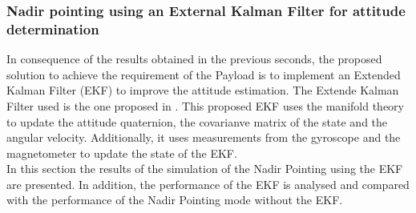 \subsubsection{Nadir pointing using an External Kalman Filter for attitude determination}
In consequence of the results obtained in the previous seconds, the proposed solution to achieve
the requirement of the Payload is to implement an Extended Kalman Filter (EKF) to improve the attitude estimation. 
The Extende Kalman Filter used is the one proposed in \cite{EKF}. This proposed EKF uses the manifold theory to update
the attitude quaternion, the covarianve matrix of the state and the angular velocity. Additionally, it uses measurements
from the gyroscope and the magnetometer to update the state of the EKF.\\

\noindent In this section the results of the simulation of the Nadir Pointing using the EKF are presented.
In addition, the performance of the EKF is analysed and compared with the performance of the Nadir Pointing mode without the EKF.

